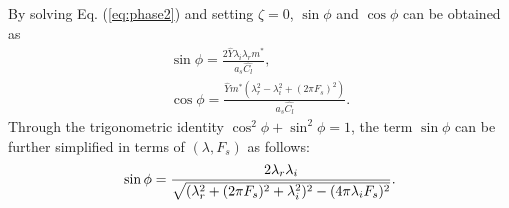 \documentclass{jfm}
\begin{document}
By solving Eq. (\ref{eq:phase2}) and setting $\zeta = 0$, 
$\sin{\phi}$ and $\cos{\phi}$ can be obtained as
\begin{equation}
\begin{array}{cc}
\sin{\phi} = \frac{2 \hat{Y} \lambda_i \lambda_r m^*}{a_s \hat{C_l}}, \\
\cos{\phi} = \frac{\hat{Y} m^*(\lambda_r^2 - \lambda_i^2 + (2 \pi F_s)^2)}{a_s \hat{C_l}}.
\end{array}
\end{equation}
Through the trigonometric identity $\cos^2{\phi} + \sin^2{\phi} = 1$, 
the term $\sin{\phi}$ can be further simplified in terms of $(\lambda, F_s)$ as follows:
\begin{equation}
\sin{\phi} = \frac{2\lambda_r\lambda_i}{\sqrt{(\lambda_r^2  \\
+ (2\pi F_s)^2 + \lambda_i^2)^2 - (4\pi\lambda_i F_s)^2 }}.
\end{equation}
\end{document}

